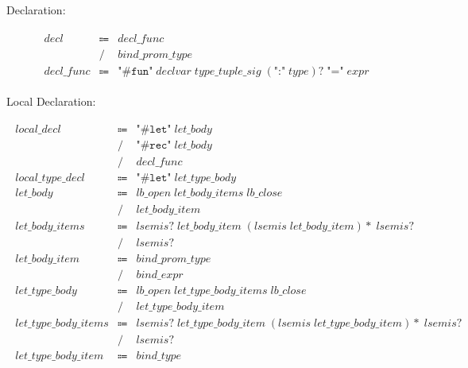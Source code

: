 Declaration:

\begin{align*}
    \begin{array}{rcll}
        \mathit{decl}
        &\Coloneq &\mathit{decl\_func} \\
        &\mathrel{/} &\mathit{bind\_prom\_type} \\
        \mathit{decl\_func}
        &\Coloneq &\texttt{"\#fun"}\; \mathit{declvar}\; \mathit{type\_tuple\_sig}\; (\texttt{":"}\; \mathit{type}){?}\; \texttt{"="}\; \mathit{expr}
    \end{array}
\end{align*}

Local Declaration:

\begin{align*}
    \begin{array}{rcll}
        \mathit{local\_decl}
        &\Coloneq &\texttt{"\#let"}\; \mathit{let\_body} \\
        &\mathrel{/} &\texttt{"\#rec"}\; \mathit{let\_body} \\
        &\mathrel{/} &\mathit{decl\_func} \\
        \mathit{local\_type\_decl}
        &\Coloneq &\texttt{"\#let"}\; \mathit{let\_type\_body} \\
        \mathit{let\_body}
        &\Coloneq &\mathit{lb\_open}\; \mathit{let\_body\_items}\; \mathit{lb\_close} \\
        &\mathrel{/} &\mathit{let\_body\_item} \\
        \mathit{let\_body\_items}
        &\Coloneq &\mathit{lsemis}{?}\; \mathit{let\_body\_item}\; (\mathit{lsemis}\; \mathit{let\_body\_item}){*}\; \mathit{lsemis}{?} \\
        &\mathrel{/} &\mathit{lsemis}{?} \\
        \mathit{let\_body\_item}
        &\Coloneq &\mathit{bind\_prom\_type} \\
        &\mathrel{/} &\mathit{bind\_expr} \\
        \mathit{let\_type\_body}
        &\Coloneq &\mathit{lb\_open}\; \mathit{let\_type\_body\_items}\; \mathit{lb\_close} \\
        &\mathrel{/} &\mathit{let\_type\_body\_item} \\
        \mathit{let\_type\_body\_items}
        &\Coloneq &\mathit{lsemis}{?}\; \mathit{let\_type\_body\_item}\; (\mathit{lsemis}\; \mathit{let\_type\_body\_item}){*}\; \mathit{lsemis}{?} \\
        &\mathrel{/} &\mathit{lsemis}{?} \\
        \mathit{let\_type\_body\_item}
        &\Coloneq &\mathit{bind\_type}
    \end{array}
\end{align*}

